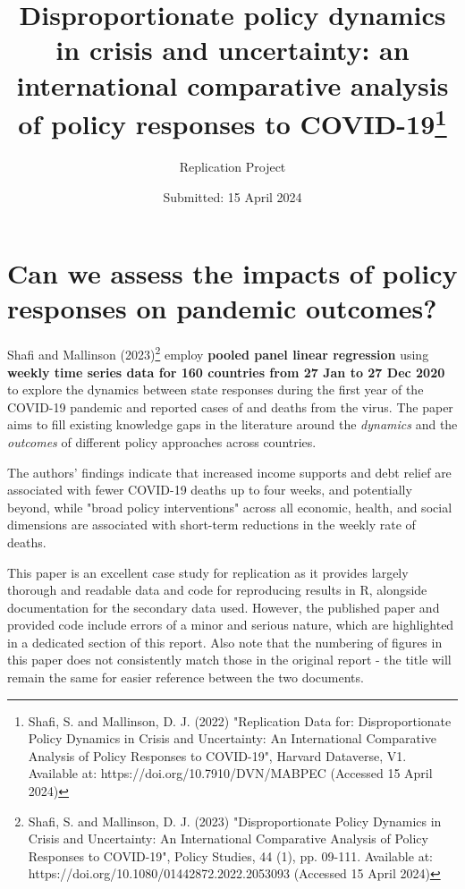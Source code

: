 \documentclass[12pt,letterpaper]{article}
\title{Disproportionate policy dynamics in crisis and uncertainty: an international comparative analysis of policy responses to COVID-19\footnote{Shafi, S. and Mallinson, D. J. (2022) "Replication Data for: Disproportionate Policy Dynamics in Crisis and Uncertainty: An International Comparative Analysis of Policy Responses to COVID-19", Harvard Dataverse, V1. Available at: https://doi.org/10.7910/DVN/MABPEC (Accessed 15 April 2024)}}
\date{Submitted: 15 April 2024}
\author{Replication Project}
\begin{document}
	\maketitle
	\section*{Can we assess the impacts of policy responses on pandemic outcomes?}
	
	\vspace{.25cm}
	
	\noindent Shafi and Mallinson (2023)\footnote{Shafi, S. and Mallinson, D. J. (2023) "Disproportionate Policy Dynamics in Crisis and Uncertainty: An International Comparative Analysis of Policy Responses to COVID-19", Policy Studies, 44 (1), pp. 09-111. Available at: https://doi.org/10.1080/01442872.2022.2053093 (Accessed 15 April 2024)} employ \textbf{pooled panel linear regression} using \textbf{weekly time series data for 160 countries from 27 Jan to 27 Dec 2020} to explore the dynamics between state responses during the first year of the COVID-19 pandemic and reported cases of and deaths from the virus. The paper aims to fill existing knowledge gaps in the literature around the \textit{dynamics} and the \textit{outcomes} of different policy approaches across countries.
	
	\vspace{.25cm}

		
	\noindent The authors' findings indicate that increased income supports and debt relief are associated with fewer COVID-19 deaths up to four weeks, and potentially beyond, while "broad policy interventions" across all economic, health, and social dimensions are associated with short-term reductions in the weekly rate of deaths.
	
	\vspace{.25cm}
		
	\noindent This paper is an excellent case study for replication as it provides largely thorough and readable data and code for reproducing results in R, alongside documentation for the secondary data used. However, the published paper and provided code include errors of a minor and serious nature, which are highlighted in a dedicated section of this report. Also note that the numbering of figures in this paper does not consistently match those in the original report - the title will remain the same for easier reference between the two documents.
	
\end{document}
